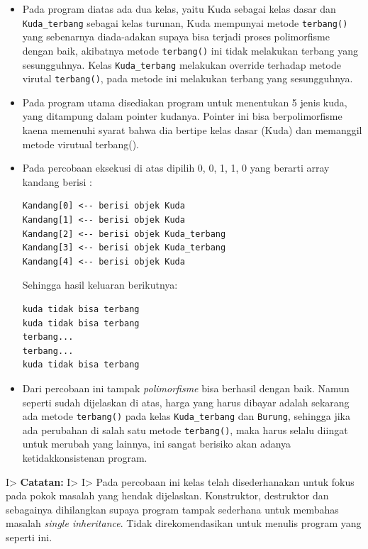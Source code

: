 \begin{itemize}
\item
  Pada program diatas ada dua kelas, yaitu Kuda sebagai kelas dasar dan
  \texttt{Kuda\_terbang} sebagai kelas turunan, Kuda mempunyai metode
  \texttt{terbang()} yang sebenarnya diada-adakan supaya bisa terjadi
  proses polimorfisme dengan baik, akibatnya metode \texttt{terbang()}
  ini tidak melakukan terbang yang sesungguhnya. Kelas
  \texttt{Kuda\_terbang} melakukan override terhadap metode virutal
  \texttt{terbang()}, pada metode ini melakukan terbang yang
  sesungguhnya.
\item
  Pada program utama disediakan program untuk menentukan 5 jenis kuda,
  yang ditampung dalam pointer kudanya. Pointer ini bisa berpolimorfisme
  kaena memenuhi syarat bahwa dia bertipe kelas dasar (Kuda) dan
  memanggil metode virutual terbang().
\item
  Pada percobaan eksekusi di atas dipilih 0, 0, 1, 1, 0 yang berarti
  array kandang berisi :

\begin{verbatim}
Kandang[0] <-- berisi objek Kuda 
Kandang[1] <-- berisi objek Kuda 
Kandang[2] <-- berisi objek Kuda_terbang 
Kandang[3] <-- berisi objek Kuda_terbang 
Kandang[4] <-- berisi objek Kuda 
\end{verbatim}

  Sehingga hasil keluaran berikutnya:

\begin{verbatim}
kuda tidak bisa terbang 
kuda tidak bisa terbang 
terbang... 
terbang... 
kuda tidak bisa terbang
\end{verbatim}
\item
  Dari percobaan ini tampak \emph{polimorfisme} bisa berhasil dengan
  baik. Namun seperti sudah dijelaskan di atas, harga yang harus dibayar
  adalah sekarang ada metode \texttt{terbang()} pada kelas
  \texttt{Kuda\_terbang} dan \texttt{Burung}, sehingga jika ada
  perubahan di salah satu metode \texttt{terbang()}, maka harus selalu
  diingat untuk merubah yang lainnya, ini sangat berisiko akan adanya
  ketidakkonsistenan program.
\end{itemize}

I\textgreater{} \textbf{Catatan:} I\textgreater{} I\textgreater{} Pada
percobaan ini kelas telah disederhanakan untuk fokus pada pokok masalah
yang hendak dijelaskan. Konstruktor, destruktor dan sebagainya
dihilangkan supaya program tampak sederhana untuk membahas masalah
\emph{single inheritance}. Tidak direkomendasikan untuk menulis program
yang seperti ini.

